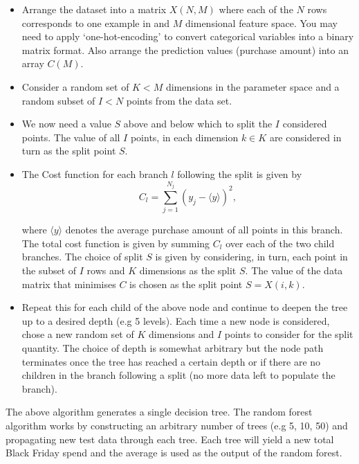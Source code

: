 \documentclass[10pt]{article}
\begin{document}
\begin{itemize}
\item Arrange the dataset into a matrix $X(N,M)$ where each of the $N$ rows corresponds to one example in and $M$ dimensional feature space. You may need to apply `one-hot-encoding' to convert categorical variables into a binary matrix format. Also arrange the prediction values (purchase amount) into an array $C(M)$.


\item Consider a random set of $K < M$ dimensions in the parameter space and a random subset of $I<N$ points from the data set. 

\item We now need a value $S$ above and below which to split the $I$ considered points. The value of all $I$ points, in each dimension $k \in K$ are considered in turn as the split point $S$.

\item The Cost function for each branch $l$ following the split is given by
\begin{equation}
C_l = \sum_{j=1}^{N_j} \left( y_j - \langle y \rangle \right)^2,
\end{equation}

\noindent where $\langle y \rangle$ denotes the average purchase amount of all points in this branch. The total cost function is given by summing $C_l$ over each of the two child branches. The choice of split $S$ is given by considering, in turn, each point in the subset of $I$ rows and $K$ dimensions as the split $S$. The value of the data matrix that minimises $C$ is chosen as the split point $S = X(i,k)$.


\item Repeat this for each child of the above node and continue to deepen the tree up to a desired depth (e.g 5 levels). Each time a new node is considered, chose a new random set of $K$ dimensions and $I$ points to consider for the split quantity. The choice of depth is somewhat arbitrary but the node path terminates once the tree has reached a certain depth or if there are no children in the branch following a split (no more data left to populate the branch).

\end{itemize}

The above algorithm generates a single decision tree. The random forest algorithm works by constructing an arbitrary number of trees (e.g 5, 10, 50) and propagating new test data through each tree. Each tree will yield a new total Black Friday spend and the average is used as the output of the random forest. 
\end{document}
